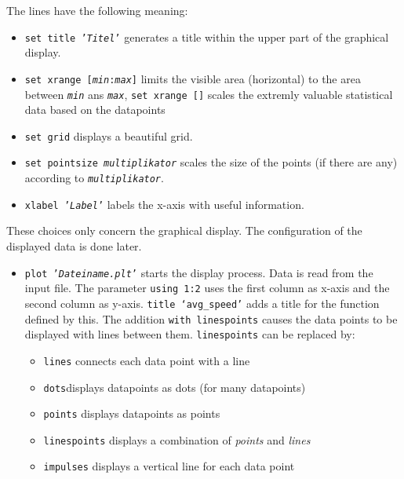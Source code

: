 The lines have the following meaning:
\begin{itemize}
\item \texttt{set title '\textit{Titel}'} generates a title within the upper part of the graphical display.
\item \texttt{set xrange [\textit{min}:\textit{max}]} limits the visible area (horizontal) to the area between \texttt{\textit{min}} ans \texttt{\textit{max}}, \texttt{set xrange []} scales the extremly valuable statistical data based on the datapoints
\item \texttt{set grid} displays a beautiful grid.
\item \texttt{set pointsize \textit{multiplikator}} scales the size of the points (if there are any) according to \texttt{\textit{multiplikator}}.
\item \texttt{xlabel '\textit{Label}'} labels the x-axis with useful information.
\end{itemize}
These choices only concern the graphical display. The configuration of the displayed data is done later.

\begin{itemize}
 \item \texttt{plot '\textit{Dateiname.plt}'} starts the display process. Data is read from the input file. The parameter \texttt{using 1:2} uses the first column as x-axis and the second column as y-axis. \texttt{title `avg\_speed'} adds a title for the function defined by this. The addition \texttt{with linespoints} causes the data points to be displayed with lines between them. \texttt{linespoints} can be replaced by:
\begin{itemize}
\item \texttt{lines} connects each data point with a line
\item \texttt{dots}displays datapoints as dots (for many datapoints)
\item \texttt{points} displays datapoints as points
\item \texttt{linespoints} displays a combination of \textit{points} and \textit{lines}
\item \texttt{impulses} displays a vertical line for each data point
\end{itemize}

\end{itemize}

